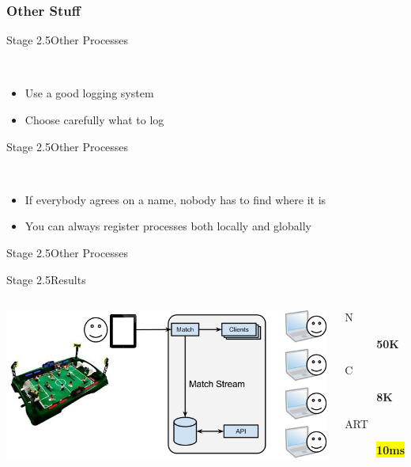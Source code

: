 \documentclass[utf8]{beamer}
\begin{document}
\subsubsection{Other Stuff}
\begin{frame}{Stage 2.5}{Other Processes}
	\begin{description}
		\item<+->[Logging]\ \\
			\begin{itemize}
				\item Use a good logging system
				\item Choose carefully what to log
			\end{itemize}
	\end{description}
\end{frame}
\begin{frame}{Stage 2.5}{Other Processes}
	\begin{description}
		\item<+->[Registration]\ \\
			\begin{itemize}
				\item If everybody agrees on a name, nobody has to find where it is
				\item You can always register processes \alert{both} locally and globally
			\end{itemize}
	\end{description}
\end{frame}
\begin{frame}{Stage 2.5}{Other Processes}
\dispatcher
\end{frame}
\begin{frame}{Stage 2.5}{Results}
	\begin{columns}
			\includegraphics[top=-1,width=\textwidth]{img/results-4.png}
			\begin{description}
				\item[N] \textbf{\Large 50K}
				\item[C] \textbf{\Large 8K}
				\item[ART] \textbf{\colorbox{yellow}{\Large 10ms}}
			\end{description}
	\end{columns}
\end{frame}
\end{document}
